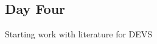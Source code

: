 \documentclass[a4paper, 12pt, notitlepage]{report}
\begin{document}

\subsection{Day Four}
%
Starting work with literature for DEVS\\
\end{document}
